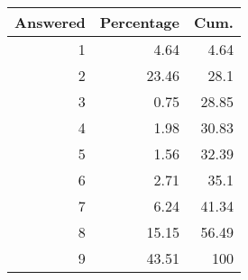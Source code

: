 \begin{tabular}{rrr}
\toprule
\multicolumn{1}{c}{Answered} & \multicolumn{1}{c}{Percentage} & \multicolumn{1}{c}{Cum.} \\
\midrule
\midrule
1     & 4.64  & 4.64 \\
2     & 23.46 & 28.1 \\
3     & 0.75  & 28.85 \\
4     & 1.98  & 30.83 \\
5     & 1.56  & 32.39 \\
6     & 2.71  & 35.1 \\
7     & 6.24  & 41.34 \\
8     & 15.15 & 56.49 \\
9     & 43.51 & 100 \\
\bottomrule
\bottomrule
\end{tabular}%
